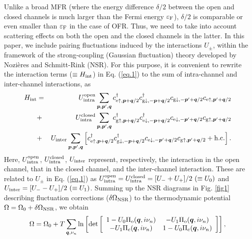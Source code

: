 \documentclass[a4paper]{jpconf}
\begin{document}
\par
Unlike a broad MFR (where the energy difference $\delta/2$ between the open and closed channels is much larger than the Fermi energy $\varepsilon_{\rm F}$), $\delta/2$ is comparable or even smaller than $\varepsilon_{\rm F}$ in the case of OFR\cite{Zhang}. Thus, we need to take into account scattering effects on both the open and the closed channels in the latter. In this paper, we include pairing fluctuations induced by the interactions $U_\pm$, within the framework of the strong-coupling (Gaussian fluctuation) theory developed by Nozi\`eres and Schmitt-Rink (NSR)\cite{NSR}. For this purpose, it is convenient to rewrite the interaction terms ($\equiv H_{\rm int}$) in Eq. (\ref{eq.1}) to the sum of intra-channel and inter-channel interactions, as
\begin{eqnarray}
H_{\rm int}
&=&
U^{\rm open}_{\rm intra}\sum_{{\bm p},{\bm p}',{\bm q}}
c_{{\rm e}\uparrow,{\bm p}+{\bm q}/2}^\dagger
c_{{\rm g}\downarrow,-{\bm p}+{\bm q}/2}^\dagger
c_{{\rm g}\downarrow,-{\bm p}'+{\bm q}/2}
c_{{\rm e}\uparrow,{\bm p}'+{\bm q}/2}
\nonumber
\\
&+&
U^{\rm closed}_{\rm intra}\sum_{{\bm p},{\bm p}',{\bm q}}
c_{{\rm g}\uparrow,{\bm p}+{\bm q}/2}^\dagger
c_{{\rm e}\downarrow,-{\bm p}+{\bm q}/2}^\dagger
c_{{\rm e}\downarrow,-{\bm p}'+{\bm q}/2}
c_{{\rm g}\uparrow,{\bm p}'+{\bm q}/2}
\nonumber
\\
&+&
U_{\rm inter}\sum_{{\bm p},{\bm p}',{\bm q}}
\left[
c_{{\rm e}\uparrow,{\bm p}+{\bm q}/2}^\dagger
c_{{\rm g}\downarrow,-{\bm p}+{\bm q}/2}^\dagger
c_{{\rm e}\downarrow,-{\bm p}'+{\bm q}/2}
c_{{\rm g}\uparrow,{\bm p}'+{\bm q}/2}
+{\rm h.c.}
\right].
\label{eq.4}
\end{eqnarray}
Here, $U_{\rm intra}^{\rm open}$, $U_{\rm intra}^{\rm closed}$, $U_{\rm inter}$ represent, respectively, the interaction in the open channel, that in the closed channel, and the inter-channel interaction. These are related to $U_\pm$ in Eq. (\ref{eq.1}) as $U_{\rm intra}^{\rm open}=U_{\rm intra}^{\rm closed}=[U_-+U_+]/2~(\equiv U_0)$ and $U_{\rm inter}=[U_--U_+]/2~(\equiv U_1)$. Summing up the NSR diagrams in Fig. \ref{fig1} describing fluctuation corrections ($\delta\Omega_{\rm NSR}$) to the thermodynamic potential $\Omega=\Omega_0+\delta\Omega_{\rm NSR}$, we obtain 
\begin{eqnarray}
\Omega = \Omega_0+ T
\sum_{{\bm q},\nu_n} \ln 
\left[
\det
\left[
\begin{array}{cc}
1-U_0\Pi_{\rm o}({\bm q},i\nu_n) & -U_1\Pi_{\rm o}({\bm q},i\nu_n) \\
-U_1\Pi_{\rm c}({\bm q},i\nu_n) & 1-U_0\Pi_{\rm c}({\bm q},i\nu_n)
\end{array}
\right]
\right],
\label{eq.5}
\end{eqnarray}
\end{document}
